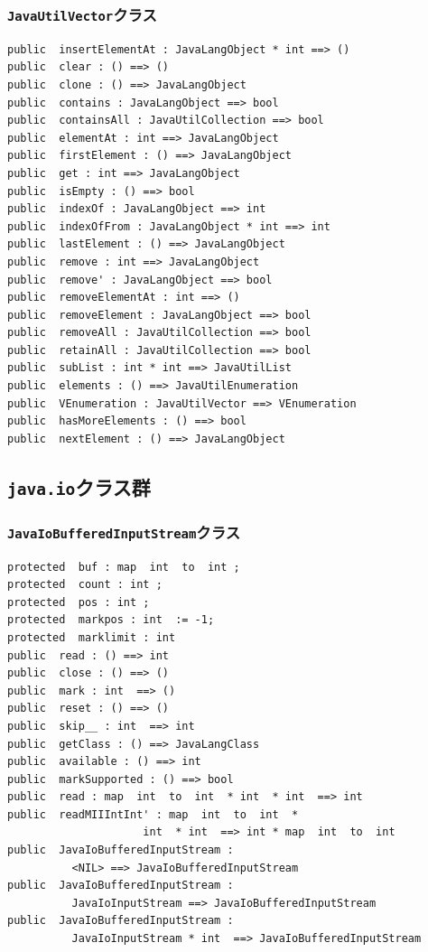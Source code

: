 \documentclass[\pformat,12pt]{jarticle}
\begin{document}
\subsubsection{\texttt{JavaUtilVector}クラス}
\begin{small}
\begin{verbatim}
public  insertElementAt : JavaLangObject * int ==> ()
public  clear : () ==> ()
public  clone : () ==> JavaLangObject
public  contains : JavaLangObject ==> bool
public  containsAll : JavaUtilCollection ==> bool
public  elementAt : int ==> JavaLangObject
public  firstElement : () ==> JavaLangObject
public  get : int ==> JavaLangObject
public  isEmpty : () ==> bool
public  indexOf : JavaLangObject ==> int
public  indexOfFrom : JavaLangObject * int ==> int
public  lastElement : () ==> JavaLangObject
public  remove : int ==> JavaLangObject
public  remove' : JavaLangObject ==> bool
public  removeElementAt : int ==> ()
public  removeElement : JavaLangObject ==> bool
public  removeAll : JavaUtilCollection ==> bool
public  retainAll : JavaUtilCollection ==> bool
public  subList : int * int ==> JavaUtilList
public  elements : () ==> JavaUtilEnumeration
public  VEnumeration : JavaUtilVector ==> VEnumeration
public  hasMoreElements : () ==> bool
public  nextElement : () ==> JavaLangObject
\end{verbatim}
\end{small}

\subsection{\texttt{java.io}クラス群}

\subsubsection{\texttt{JavaIoBufferedInputStream}クラス}
\begin{small}
\begin{verbatim}
protected  buf : map  int  to  int ;
protected  count : int ;
protected  pos : int ;
protected  markpos : int  := -1;
protected  marklimit : int
public  read : () ==> int
public  close : () ==> ()
public  mark : int  ==> ()
public  reset : () ==> ()
public  skip__ : int  ==> int
public  getClass : () ==> JavaLangClass
public  available : () ==> int
public  markSupported : () ==> bool
public  read : map  int  to  int  * int  * int  ==> int
public  readMIIIntInt' : map  int  to  int  * 
                     int  * int  ==> int * map  int  to  int
public  JavaIoBufferedInputStream : 
          <NIL> ==> JavaIoBufferedInputStream
public  JavaIoBufferedInputStream : 
          JavaIoInputStream ==> JavaIoBufferedInputStream
public  JavaIoBufferedInputStream : 
          JavaIoInputStream * int  ==> JavaIoBufferedInputStream
\end{verbatim}
\end{small}
\end{document}
